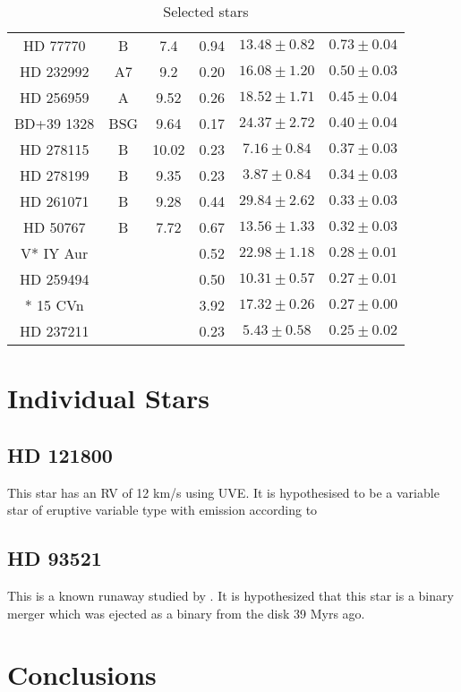 \documentclass[fleqn,usenatbib]{mnras}
\begin{document}
\begin{table}
\begin{center}
\begin{tabular}{c c c c c c}
HD 77770 &B	&7.4& 0.94 & $13.48\pm 0.82$& $0.73 \pm 0.04$\\
HD 232992 &A7&9.2& 0.20 & $16.08\pm 1.20$& $0.50\pm 0.03$\\
HD 256959 &A&9.52& 0.26 & $18.52\pm 1.71$& $0.45 \pm 0.04$\\
BD+39 1328&BSG&9.64 &  0.17 & $24.37  \pm    2.72$ & $0.40 \pm 0.04$\\
HD 278115&B	&10.02&  0.23 &  $7.16  \pm    0.84$ & $0.37 \pm 0.03$\\
HD 278199&B	&9.35&  0.23 &  $3.87   \pm   0.84$ & $ 0.34 \pm 0.03$\\
HD 261071&B	&9.28 &  0.44 & $29.84  \pm    2.62$ & $0.33  \pm 0.03$\\
HD  50767&B	&7.72 &  0.67 & $13.56  \pm    1.33$ & $0.32 \pm 0.03$\\
V* IY Aur &&   &  0.52 & $22.98 \pm     1.18$ & $0.28  \pm 0.01$\\
HD 259494 &&   &  0.50 & $10.31   \pm   0.57$ & $0.27 \pm 0.01$\\
*  15 CVn  &&  &  3.92 & $17.32  \pm    0.26$ & $0.27 \pm 0.00$\\
HD 237211  &&  &  0.23 &  $5.43 \pm     0.58$ & $0.25 \pm 0.02$\\

\hline
\end{tabular}
\caption{Selected stars}
 \label{tab:significance}
\end{center}
\end{table}
\section{Individual Stars}
\subsection{HD 121800}
This star has an RV of 12 km/s using UVE. It is hypothesised to be a variable star of eruptive variable type with emission according to \citet{2022arXiv221117238R}
\subsection{HD 93521}

This is a known runaway studied by \citet{2022AJ....163..100G}. It is hypothesized that this star is a binary merger which was ejected as a binary from the disk 39 Myrs ago.
\section{Conclusions}
\end{document}
